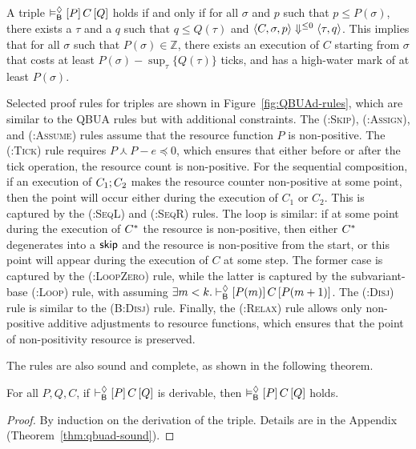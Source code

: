 \begin{definition}
  A \QBUAd triple $\vDash^{\Diamond}_{\mathsf{B}}\left[P\right]C\left[Q\right]$ holds if and only if for all $\sigma$ and $p$ such that $p\le P(\sigma)$, there exists a $\tau$ and a $q$ such that $q\le Q(\tau)$ and $\left\langle C,\sigma,p\right\rangle\Downarrow^{\le 0}\left\langle\tau,q\right\rangle$.
  This implies that for all $\sigma$ such that $P(\sigma)\in\mathbb{Z}$, there exists an execution of $C$ starting from $\sigma$ that costs at least $P(\sigma)-\sup_{\tau}\{Q(\tau)\}$ ticks, and has a high-water mark of at least $P(\sigma)$.
\end{definition}

Selected proof rules for \QBUAd triples are shown in Figure~\ref{fig:QBUAd-rules}, which are similar to the QBUA rules but with additional constraints.
The \textsc{(\Bd:Skip)}, \textsc{(\Bd:Assign)}, and \textsc{(\Bd:Assume)} rules assume that the resource function $P$ is non-positive.
The \textsc{(\Bd:Tick)} rule requires $P\curlywedge P-e\preceq 0$, which ensures that either before or after the tick operation, the resource count is non-positive.
For the sequential composition, if an execution of $C_1;C_2$ makes the resource counter non-positive at some point, then the point will occur either during the execution of $C_1$ or $C_2$. This is captured by the \textsc{(\Bd:SeqL)} and \textsc{(\Bd:SeqR)} rules.
The loop is similar: if at some point during the execution of $C^*$ the resource is non-positive, then either $C^*$ degenerates into a $\textsf{skip}$ and the resource is non-positive from the start, or this point will appear during the execution of $C$ at some step. The former case is captured by the \textsc{(\Bd:LoopZero)} rule, while the latter is captured by the subvariant-base \textsc{(\Bd:Loop)} rule, with assuming $\exists m<k.\vdash^{\Diamond}_{\mathsf{B}}\left[P(m)\right]C\left[P(m+1)\right]$.
The \textsc{(\Bd:Disj)} rule is similar to the \textsc{(B:Disj)} rule.
Finally, the \textsc{(\Bd:Relax)} rule allows only non-positive additive adjustments to resource functions, which ensures that the point of non-positivity resource is preserved.

The \QBUAd rules are also sound and complete, as shown in the following theorem.

\begin{theorem}
  For all $P,Q,C$, if $\vdash^{\Diamond}_{\mathsf{B}}\left[P\right]C\left[Q\right]$ is derivable, then $\vDash^{\Diamond}_{\mathsf{B}}\left[P\right]C\left[Q\right]$ holds.
\end{theorem}

\begin{proof}
  By induction on the derivation of the triple. Details are in the Appendix (Theorem~\ref{thm:qbuad-sound}).
\end{proof}


